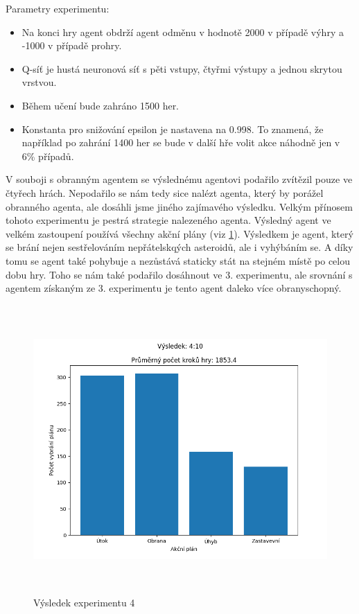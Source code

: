 Parametry experimentu:
\begin{itemize}
    \item Na konci hry agent obdrží agent odměnu v hodnotě 2000 v případě výhry a -1000 v případě prohry.
    \item Q-síť je hustá neuronová síť s pěti vstupy, čtyřmi výstupy a jednou skrytou vrstvou. 
    \item Během učení bude zahráno 1500 her.
    \item Konstanta pro snižování epsilon je nastavena na 0.998. To znamená, že například po zahrání 1400 her se bude v další hře volit akce náhodně jen v 6\% případů. 
\end{itemize}

\par
V souboji s obranným agentem se výslednému agentovi podařilo zvítězil pouze ve čtyřech hrách. 
Nepodařilo se nám tedy sice nalézt agenta, který by porážel obranného agenta, ale dosáhli jsme jiného zajímavého výsledku.
Velkým přínosem tohoto experimentu je pestrá strategie nalezeného agenta. Výsledný agent ve velkém zastoupení používá všechny akční plány (viz \ref{Výsledek experimentu 04}). 
Výsledkem je agent, který se brání nejen sestřelováním nepřátelskqých asteroidů, ale i vyhýbáním se. A díky tomu se agent také pohybuje a nezůstává staticky stát na stejném místě po celou dobu hry.
Toho se nám také podařilo dosáhnout ve 3. experimentu, ale srovnání s agentem získaným ze 3. experimentu je tento agent daleko více obranyschopný.




\begin{figure}[p]\centering
\includegraphics[width=145mm, height=110mm]{./Obrazky/Experiment04Results.png}
\caption{Výsledek experimentu 4}
\label{Výsledek experimentu 04}
\end{figure}

